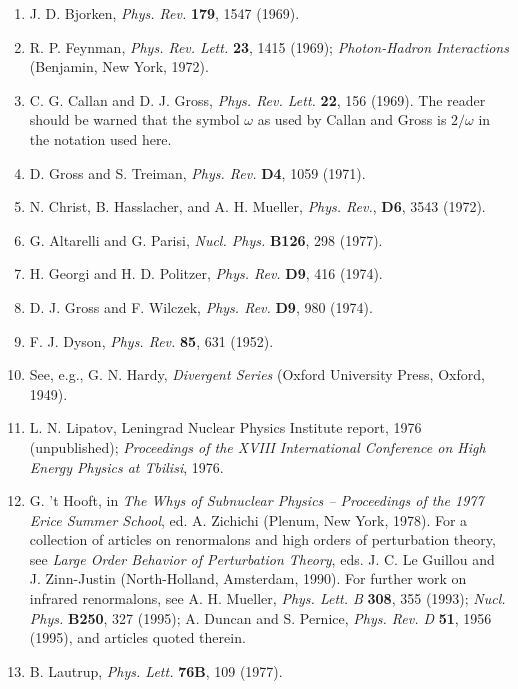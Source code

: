 \begin{enumerate}
\item {}\label{ch20-ref-10}
J. D. Bjorken, \emph{Phys. Rev.} \textbf{179}, 1547 (1969).

\item {}\label{ch20-ref-11}
R. P. Feynman, \emph{Phys. Rev. Lett.} \textbf{23}, 1415 (1969); \emph{Photon-Hadron Interactions} (Benjamin, New York, 1972).

\item {}\label{ch20-ref-12}
C. G. Callan and D. J. Gross, \emph{Phys. Rev. Lett.} \textbf{22}, 156 (1969). The reader should be warned that the symbol $\omega$ as used by Callan and Gross is $2/\omega$ in the notation used here.

\item {}\label{ch20-ref-13}
D. Gross and S. Treiman, \emph{Phys. Rev.} \textbf{D4}, 1059 (1971).

\item {}\label{ch20-ref-14}
N. Christ, B. Hasslacher, and A. H. Mueller, \emph{Phys. Rev.}, \textbf{D6}, 3543 (1972).

\item {}\label{ch20-ref-15}
G. Altarelli and G. Parisi, \emph{Nucl. Phys.} \textbf{B126}, 298 (1977).

\item {}\label{ch20-ref-16}
H. Georgi and H. D. Politzer, \emph{Phys. Rev.} \textbf{D9}, 416 (1974).

\item {}\label{ch20-ref-17}
D. J. Gross and F. Wilczek, \emph{Phys. Rev.} \textbf{D9}, 980 (1974).

\item {}\label{ch20-ref-18}
F. J. Dyson, \emph{Phys. Rev.} \textbf{85}, 631 (1952).

\item {}\label{ch20-ref-19}
See, e.g., G. N. Hardy, \emph{Divergent Series} (Oxford University Press, Oxford, 1949).

\item {}\label{ch20-ref-20}
L. N. Lipatov, Leningrad Nuclear Physics Institute report, 1976 (unpublished); \emph{Proceedings of the XVIII International Conference on High Energy Physics at Tbilisi}, 1976.

\item {}\label{ch20-ref-21}
G. 't Hooft, in \emph{The Whys of Subnuclear Physics -- Proceedings of the 1977 Erice Summer School}, ed. A. Zichichi (Plenum, New York, 1978). For a collection of articles on renormalons and high orders of perturbation theory, see \emph{Large Order Behavior of Perturbation Theory}, eds. J. C. Le Guillou and J. Zinn-Justin (North-Holland, Amsterdam, 1990). For further work on infrared renormalons, see A. H. Mueller, \emph{Phys. Lett. B} \textbf{308}, 355 (1993); \emph{Nucl. Phys.} \textbf{B250}, 327 (1995); A. Duncan and S. Pernice, \emph{Phys. Rev. D} \textbf{51}, 1956 (1995), and articles quoted therein.

\item {}\label{ch20-ref-22}
B. Lautrup, \emph{Phys. Lett.} \textbf{76B}, 109 (1977).
\end{enumerate}
